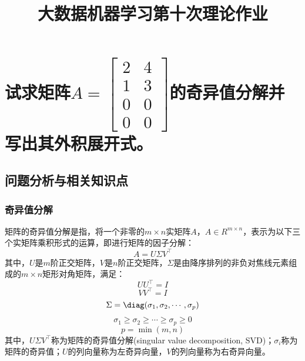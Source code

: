 \documentclass{article}
\title{大数据机器学习第十次理论作业}
\begin{document}
\maketitle

\section{试求矩阵$A=\left[\begin{matrix}2&4\\1&3\\0&0\\0&0\end{matrix}\right]$的奇异值分解并写出其外积展开式。}
\subsection{问题分析与相关知识点}
\subsubsection{奇异值分解}
矩阵的奇异值分解是指，将一个非零的$m\times n$实矩阵$A$，$A \in R^{m\times n}$，表示为以下三个实矩阵乘积形式的运算，即进行矩阵的因子分解：
\begin{equation}
    A = U\Sigma V^\intercal
\end{equation}
其中，$U$是$m$阶正交矩阵，$V$是$n$阶正交矩阵，$\Sigma$是由降序排列的非负对焦线元素组成的$m\times n$矩形对角矩阵，满足：
$$
U U^\intercal = I
$$
$$
V V^\intercal = I
$$
$$
\Sigma = \diag(\sigma_1,\sigma_2,\cdots,\sigma_p)
$$
$$
\sigma_1 \geq \sigma_2 \geq \cdots \geq \sigma_p \geq 0
$$
$$
p = \min(m,n)
$$
其中，$U\Sigma V^\intercal$称为矩阵的奇异值分解(singular value decomposition, SVD)；$\sigma_i$称为矩阵的奇异值；$U$的列向量称为左奇异向量，$V$的列向量称为右奇异向量。
\end{document}
